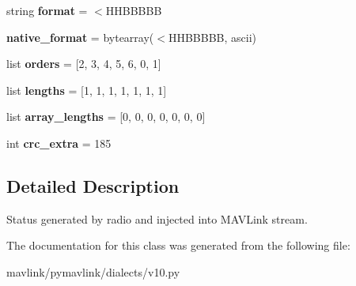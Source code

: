 \begin{DoxyCompactItemize}
string {\bfseries format} = \textquotesingle{}$<$H\+H\+B\+B\+B\+BB\textquotesingle{}
\item 
\mbox{\label{classpymavlink_1_1dialects_1_1v10_1_1MAVLink__radio__status__message_aeee2efa903ce93b077c7db6e5ca132bd}} 
{\bfseries native\+\_\+format} = bytearray(\textquotesingle{}$<$H\+H\+B\+B\+B\+BB\textquotesingle{}, \textquotesingle{}ascii\textquotesingle{})
\item 
\mbox{\label{classpymavlink_1_1dialects_1_1v10_1_1MAVLink__radio__status__message_af06bec0209d573eb08d455fac864a497}} 
list {\bfseries orders} = \mbox{[}2, 3, 4, 5, 6, 0, 1\mbox{]}
\item 
\mbox{\label{classpymavlink_1_1dialects_1_1v10_1_1MAVLink__radio__status__message_a59b14f24654dba8c2d4b650de786b228}} 
list {\bfseries lengths} = \mbox{[}1, 1, 1, 1, 1, 1, 1\mbox{]}
\item 
\mbox{\label{classpymavlink_1_1dialects_1_1v10_1_1MAVLink__radio__status__message_a26b26dcb3262fe1cb821ee705b0aa344}} 
list {\bfseries array\+\_\+lengths} = \mbox{[}0, 0, 0, 0, 0, 0, 0\mbox{]}
\item 
\mbox{\label{classpymavlink_1_1dialects_1_1v10_1_1MAVLink__radio__status__message_aa693dd3b9c3585def66f320862a7a96d}} 
int {\bfseries crc\+\_\+extra} = 185
\end{DoxyCompactItemize}


\subsection{Detailed Description}
\begin{DoxyVerb}Status generated by radio and injected into MAVLink stream.
\end{DoxyVerb}
 

The documentation for this class was generated from the following file\+:\begin{DoxyCompactItemize}
\item 
mavlink/pymavlink/dialects/v10.\+py\end{DoxyCompactItemize}
